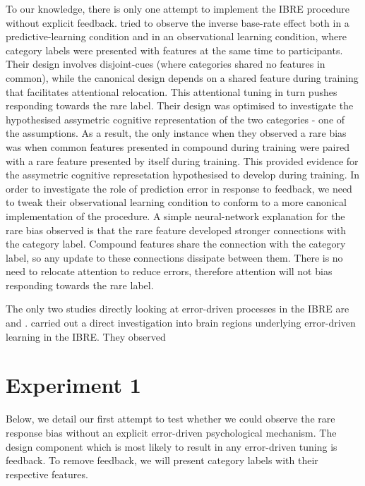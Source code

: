 \documentclass[10pt,letterpaper]{article}
\begin{document}
To our knowledge, there is only one attempt to implement the IBRE procedure without explicit feedback.
 tried to observe the inverse base-rate effect both in a predictive-learning condition and in an observational learning condition, where category labels were presented with features at the same time to participants.
Their design involves disjoint-cues (where categories shared no features in common), while the canonical design depends on a shared feature during training that facilitates attentional relocation.
This attentional tuning in turn pushes responding towards the rare label.
Their design was optimised to investigate the hypothesised assymetric cognitive representation of the two categories - one of the assumptions.
As a result, the only instance when they observed a rare bias was when common features presented in compound during training were paired with a rare feature presented by itself during training.
This provided evidence for the assymetric cognitive represetation hypothesised to develop during training.
In order to investigate the role of prediction error in response to feedback, we need to tweak their observational learning condition to conform to a more canonical implementation of the procedure.
A simple neural-network explanation for the rare bias  observed is that the rare feature developed stronger connections with the category label.
Compound features share the connection with the category label, so any update to these connections dissipate between them.
There is no need to relocate attention to reduce errors, therefore attention will not bias responding towards the rare label.

The only two studies directly looking at error-driven processes in the IBRE are  and .
 carried out a direct investigation into brain regions underlying error-driven learning in the IBRE.
They observed

\section{Experiment 1}

Below, we detail our first attempt to test whether we could observe the rare response bias without an explicit error-driven psychological mechanism.
The design component which is most likely to result in any error-driven tuning is feedback.
To remove feedback, we will present category labels with their respective features.
\end{document}
